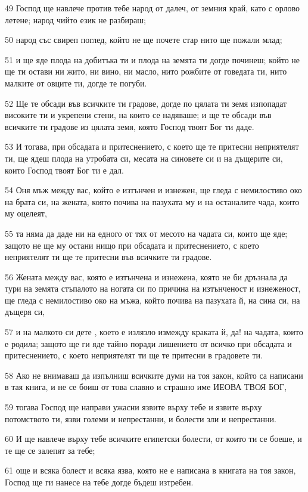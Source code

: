 \par 49 Господ ще навлече против тебе народ от далеч, от земния край, като с орлово летене; народ чийто език не разбираш;
\par 50 народ със свиреп поглед, който не ще почете стар нито ще пожали млад;
\par 51 и ще яде плода на добитъка ти и плода на земята ти догде починеш; който не ще ти остави ни жито, ни вино, ни масло, нито рожбите от говедата ти, нито малките от овците ти, догде те погуби.
\par 52 Ще те обсади във всичките ти градове, догде по цялата ти земя изпопадат високите ти и укрепени стени, на които се надяваше; и ще те обсади във всичките ти градове из цялата земя, която Господ твоят Бог ти даде.
\par 53 И тогава, при обсадата и притеснението, с което ще те притесни неприятелят ти, ще ядеш плода на утробата си, месата на синовете си и на дъщерите си, които Господ твоят Бог ти е дал.
\par 54 Оня мъж между вас, който е изтънчен и изнежен, ще гледа с немилостиво око на брата си, на жената, която почива на пазухата му и на останалите чада, които му оцелеят,
\par 55 та няма да даде ни на едного от тях от месото на чадата си, които ще яде; защото не ще му остани нищо при обсадата и притеснението, с което неприятелят ти ще те притесни във всичките ти градове.
\par 56 Жената между вас, която е изтънчена и изнежена, която не би дръзнала да тури на земята стъпалото на ногата си по причина на изтънченост и изнеженост, ще гледа с немилостиво око на мъжа, който почива на пазухата й, на сина си, на дъщеря си,
\par 57 и на малкото си дете , което е излязло измежду краката й, да! на чадата, които е родила; защото ще ги яде тайно поради лишението от всичко при обсадата и притеснението, с което неприятелят ти ще те притесни в градовете ти.
\par 58 Ако не внимаваш да изпълниш всичките думи на тоя закон, който са написани в тая книга, и не се боиш от това славно и страшно име ИЕОВА ТВОЯ БОГ,
\par 59 тогава Господ ще направи ужасни язвите върху тебе и язвите върху потомството ти, язви големи и непрестанни, и болести зли и непрестанни.
\par 60 И ще навлече върху тебе всичките египетски болести, от които ти се боеше, и те ще се залепят за тебе;
\par 61 още и всяка болест и всяка язва, която не е написана в книгата на тоя закон, Господ ще ги нанесе на тебе догде бъдеш изтребен.
